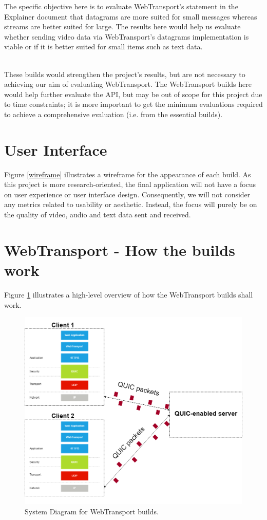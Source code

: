 \begin{description}
The specific objective here is to evaluate WebTransport's statement in the Explainer document \cite{wtexplainer} that datagrams are more suited for small messages whereas streams are better suited for large. The results here would help us evaluate whether sending video data via WebTransport's datagrams implementation is viable or if it is better suited for small items such as text data.
\end{description}
\hfill\\
These builds would strengthen the project's results, but are not necessary to achieving our aim of evaluating WebTransport. The WebTransport builds here would help further evaluate the API, but may be out of scope for this project due to time constraints; it is more important to get the minimum evaluations required to achieve a comprehensive evaluation (i.e. from the essential builds).

\section{User Interface}

Figure \ref{wireframe} illustrates a wireframe for the appearance of each build. As this project is more research-oriented, the final application will not have a focus on user experience or user interface design. Consequently, we will not consider any metrics related to usability or aesthetic. Instead, the focus will purely be on the quality of video, audio and text data sent and received.

\section{WebTransport - How the builds work}
Figure \ref{wt_systemdiagram} illustrates a high-level overview of how the WebTransport builds shall work. 

\begin{figure}[h]
    \centering
    \includegraphics[width=0.7\columnwidth]{images/webtransport build diagram.png}
	\caption{System Diagram for WebTransport builds.}
    \label{wt_systemdiagram}
\end{figure}

